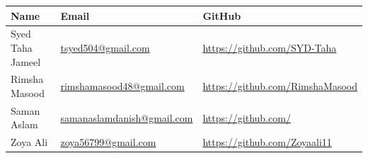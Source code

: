 \begin{table}[h]
\centering
\begin{tabular}{l l l}
\textbf{Name} & \textbf{Email} & \textbf{GitHub} \\
\hline
Syed Taha Jameel & \href{tsyed504@gmail.com}{tsyed504@gmail.com} & \url{https://github.com/SYD-Taha} \\
Rimsha Masood & \href{rimshamasood48@gmail.com}{rimshamasood48@gmail.com} & \url{https://github.com/RimshaMasood} \\
Saman Aslam & \href{samanaslamdanish@gmail.com}{samanaslamdanish@gmail.com} & \url{https://github.com/} \\
Zoya Ali & \href{zoya56799@gmail.com}{zoya56799@gmail.com} & \url{https://github.com/Zoyaali11} \\
\end{tabular}
\end{table}